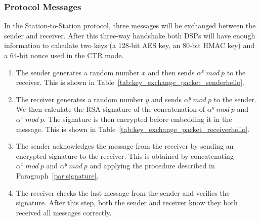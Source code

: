\documentclass[a4paper]{article}
\begin{document}
\subsubsection{Protocol Messages}

In the Station-to-Station protocol, three messages will be exchanged between the sender and receiver. After this three-way handshake both DSPs will have enough information to calculate two keys (a 128-bit AES key, an 80-bit HMAC key) and a 64-bit nonce used in the CTR mode.

\begin{enumerate}
    \item The sender generates a random number $x$ and then sends $\alpha^x\ mod\ p$ to the receiver. This is shown in Table~\ref{tab:key_exchange_packet_senderhello}.
    \item The receiver generates a random number $y$ and sends $\alpha^y\ mod\ p$ to the sender. We then calculate the RSA signature of the concatenation of $\alpha^y\ mod\ p$ and $\alpha^x\ mod\ p$. The signature is then encrypted before embedding it in the message. This is shown in Table~\ref{tab:key_exchange_packet_receiverhello}.
    \item The sender acknowledges the message from the receiver by sending an encrypted signature to the receiver. This is obtained by concatenating $\alpha^x\ mod\ p$ and $\alpha^y\ mod\ p$ and applying the procedure described in Paragraph~\ref{par:signature}.
    \item The receiver checks the last message from the sender and verifies the signature. After this step, both the sender and receiver know they both received all messages correctly.
\end{enumerate}
\end{document}
